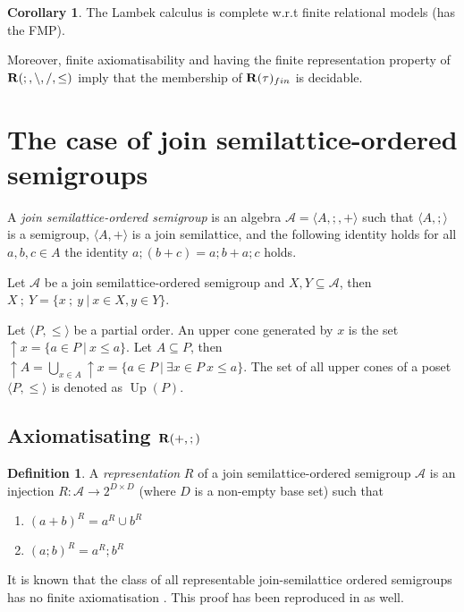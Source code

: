 \documentclass[a4paper]{article}
\theoremstyle{definition}
\newtheorem{definition}{Definition}
\theoremstyle{theorem}
\theoremstyle{proposition}
\theoremstyle{lemma}
\theoremstyle{ex}
\theoremstyle{corollary}
\newtheorem{corollary}{Corollary}
\theoremstyle{claim}
\begin{document}
\begin{corollary} \label{fmp}
  The Lambek calculus is complete w.r.t finite relational models (has the FMP).
\end{corollary}

Moreover, finite axiomatisability and having the finite representation property of ${\bf R}(;, \setminus, /, \leq)$ imply that the membership of ${\bf R}(\tau)_{fin}$ is decidable.

\section{The case of join semilattice-ordered semigroups}

A \emph{join semilattice-ordered semigroup} is an algebra $\mathcal{A} = \langle A, ;, + \rangle$ such that $\langle A, ; \rangle$ is a semigroup, $\langle A, + \rangle$ is a join semilattice, and the following identity holds for all $a, b, c \in A$ the identity $a ; (b + c) = a ; b + a ; c$ holds.

Let $\mathcal{A}$ be a join semilattice-ordered semigroup and $X, Y \subseteq \mathcal{A}$, then $X \: ; \: Y = \{ x \: ; \: y \: | \: x \in X, y \in Y \}$.

Let $\langle P, \leq \rangle$ be a partial order. An upper cone generated by $x$ is the set $\uparrow x = \{ a \in P \: | \: x \leq a \}$. Let $A \subseteq P$, then $\uparrow A = \bigcup \limits_{x \in A} \uparrow x = \{ a \in P \: | \: \exists x \in P \: x \leq a \}$. The set of all upper cones of a poset $\langle P, \leq \rangle$ is denoted as $\operatorname{Up}(P)$.

\subsection{Axiomatisating ${\bf R}(+, ;)$}

\begin{definition}
  A \emph{representation} $R$ of a join semilattice-ordered semigroup $\mathcal{A}$
  is an injection $R : \mathcal{A} \to 2^{D \times D}$ (where $D$ is a non-empty base set) such that
  \begin{enumerate}
    \item $(a + b)^R = a^R \cup b^R$
    \item $(a ; b)^R = a^R ; b^R$
  \end{enumerate}
\end{definition}

It is known that the class of all representable join-semilattice ordered semigroups has no finite axiomatisation \cite{andreka1989union}. This proof has been reproduced in \cite{andreka2011axiomatizability} as well.
\end{document}
